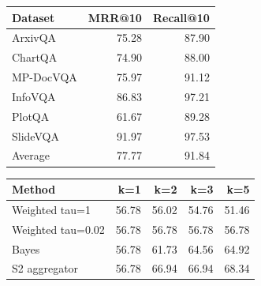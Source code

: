 \begin{table}[t]
\centering
\begin{tabular}{lrr}
\hline
Dataset & MRR@10 & Recall@10 \\
\hline
ArxivQA & 75.28 & 87.90 \\
ChartQA & 74.90 & 88.00 \\
MP-DocVQA & 75.97 & 91.12 \\
InfoVQA & 86.83 & 97.21 \\
PlotQA & 61.67 & 89.28 \\
SlideVQA & 91.97 & 97.53 \\
Average & 77.77 & 91.84 \\
\hline
\end{tabular}
\end{table}

\begin{table}[t]
\centering
\begin{tabular}{lrrrr}
\hline
Method & k=1 & k=2 & k=3 & k=5 \\
\hline
Weighted tau=1 & 56.78 & 56.02 & 54.76 & 51.46 \\
Weighted tau=0.02 & 56.78 & 56.78 & 56.78 & 56.78 \\
Bayes & 56.78 & 61.73 & 64.56 & 64.92 \\
S2 aggregator & 56.78 & 66.94 & 66.94 & 68.34 \\
\hline
\end{tabular}
\end{table}
